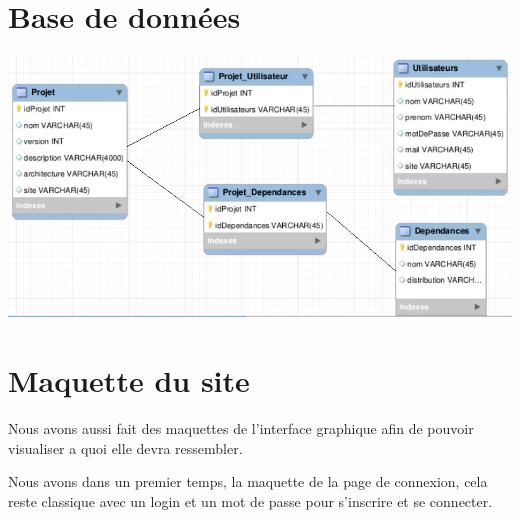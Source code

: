 \documentclass[12pt,a4paper]{article}
\begin{document}
\begin{itemize}
  
  
\end{itemize}

\section{Base de données}
\includegraphics[scale=0.8]{../img/bdd.jpg}

\section{Maquette du site}
	Nous avons aussi fait des maquettes de l'interface graphique afin de pouvoir visualiser a quoi elle devra ressembler.

Nous avons dans un premier temps, la maquette de la page de connexion, cela reste classique avec un login et un mot de passe pour s'inscrire et se connecter.
	
\end{document}
